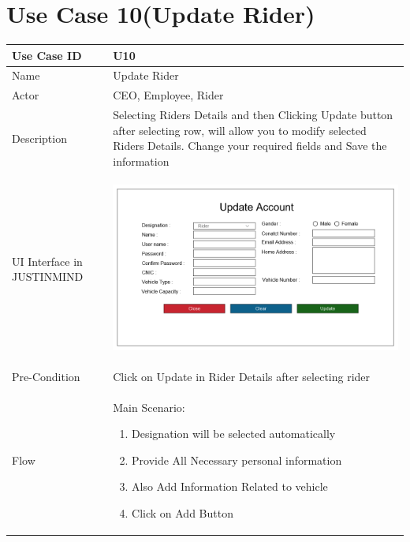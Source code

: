 \documentclass[12pt,a4paper]{report}
\begin{document}
\section{Use Case 10(Update Rider)}

\begin{tabular}{ | m{3cm} | m{12cm}| } \hline

Use Case ID &  U10 \\\hline

Name  	    &  Update Rider \\ \hline

Actor     	& CEO, Employee, Rider \\ \hline

Description & Selecting Riders Details and then Clicking Update button after selecting row, will allow you to modify selected Riders Details. Change your required fields and Save the information \\ \hline

UI Interface in JUSTINMIND & \begin{center} \includegraphics[scale=0.3]{./UIs for Latex Reports/UI-021 UpdateRider@1x.png}\end{center}  \\ \hline

Pre-Condition &  Click on Update in Rider Details after selecting rider \\ \hline

Flow & Main Scenario:

\begin{enumerate}
\item   Designation will be selected automatically
\item  Provide All Necessary personal information
\item  Also Add Information Related to vehicle
\item  Click on Add Button



\end{enumerate}
\end{tabular}
\end{document}
